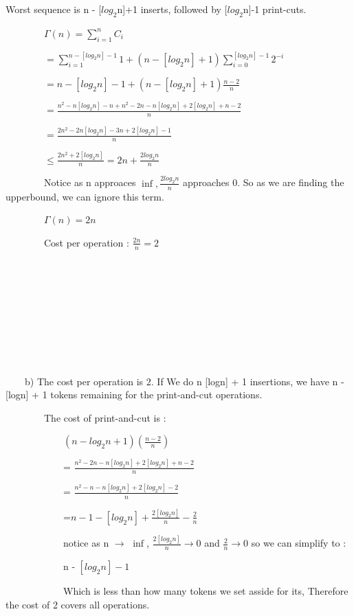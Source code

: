 \documentclass{assignment-263}
\begin{document}
Worst sequence is n - [$log_2$n]+1 inserts, followed by [$log_2$n]-1 print-cuts.

 \ \ \ \ \ \ \ \ $\Gamma(n) = \sum_{i = 1}^{n} C_i$ 

 \ \ \ \ \ \ \ \ $ = \sum_{i = 1}^{ n-[log_2n]-1} 1 +  (n - [log_2n] + 1 )\sum_{i = 0}^{ [log_2n]-1}{2^{-i}}$

 \ \ \ \ \ \ \ \ $ = n - [log_2n] - 1 + (n - [log_2n]+1)\frac{n-2}{n}$

 \ \ \ \ \ \ \ \ $ = \frac{n^2 - n[log_2n] - n + n^2 - 2n - n [log_2n] +  2[log_2n] + n - 2}{n}$

 \ \ \ \ \ \ \ \ $ = \frac{2n^2-2n[log_2n]-3n+2[log_2n]-1}{n}$

 \ \ \ \ \ \ \ \ $ \leq \frac{2n^2 +2[log_2n]}{n} = 2n + \frac{2log_2n}{n}$

 \ \ \ \ \ \ \ \  Notice as n approaces $\inf, \frac{2log_2n}{n}$ approaches 0. So as we are finding the upperbound, we can ignore this term.

 \ \ \ \ \ \ \ \ $ \Gamma(n) = 2n$

 \ \ \ \ \ \ \ \  Cost per operation : $\frac{2n}{n} = 2 $


 \ \ \ \ \ \ \ \ \ \ \ \ 


 \ \ \ \ \ \ \ \ \ \ \ \ 


 \ \ \ \ \ \ \ \ \ \ \ \ 


 \ \ \ \ \ \ \ \ \ \ \ \ 


 \ \ \ \ \ \ \ \ \ \ \ \ 



\ \ \ \ b) The cost per operation is 2. If We do n  [logn] + 1 insertions, we have n - [logn] + 1 tokens remaining for the print-and-cut operations.

 \ \ \ \ \ \ \ \ The cost of print-and-cut is :

 \ \ \ \ \ \ \ \ \ \ \ \ $(n-log_2n+1)(\frac{n-2}{n})$


 \ \ \ \ \ \ \ \ \ \ \ \ =  $\frac{n^2-2n-n[log_2n]+2[log_2n]+n - 2}{n}$


 \ \ \ \ \ \ \ \ \ \ \ \ =  $\frac{n^2-n-n[log_2n]+2[log_2n] - 2}{n}$


 \ \ \ \ \ \ \ \ \ \ \ \ =$ n - 1 - [log_2n] + \frac{2[log_2n]}{n} - \frac{2}{n}$

 \ \ \ \ \ \ \ \ \ \ \ \  notice as n $\rightarrow$ $\inf$, $\frac{2[log_2n]}{n} \rightarrow 0$ and $\frac{2}{n} \rightarrow 0$ so we can simplify to :


 \ \ \ \ \ \ \ \ \ \ \ \  n - $[log_2n] - 1$


 \ \ \ \ \ \ \ \ \ \ \ \ Which is less than how many tokens we set asside for its, Therefore the cost of 2 covers all operations.
\end{document}
